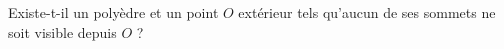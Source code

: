 Existe-t-il un polyèdre et un point $O$ extérieur tels qu'aucun de ses sommets ne soit visible depuis $O$ ?
